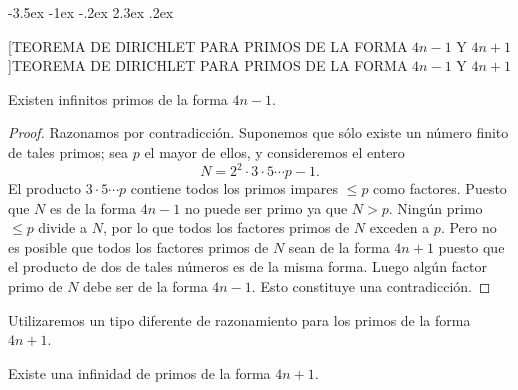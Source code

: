 \documentclass[12pt,a4paper]{book}
\makeatletter
\renewcommand\section{\@startsection{section}{1}{\z@}%
  {-3.5ex \@plus -1ex \@minus -.2ex}%
  {2.3ex \@plus .2ex}%
  {\normalfont\Large\bfseries\raggedright}}
\makeatother
\begin{document}
    \section[TEOREMA DE DIRICHLET PARA PRIMOS DE LA FORMA \texorpdfstring{$4n-1$}{4n-1} Y \texorpdfstring{$4n+1$}{4n+1}]{TEOREMA DE DIRICHLET PARA PRIMOS DE LA FORMA \texorpdfstring{$4n-1$}{4n-1} Y \texorpdfstring{$4n+1$}{4n+1}}

    \begin{teorema}
        Existen infinitos primos de la forma $4n-1$.
    \end{teorema}

    \begin{proof}
        Razonamos por contradicción. Suponemos que sólo existe un número finito de tales
        primos; sea $p$ el mayor de ellos, y consideremos el entero
        \begin{equation*}
            N=2^{2}\cdot3\cdot5\cdots p-1.
        \end{equation*}
        El producto $3\cdot5\cdots p$ contiene todos los primos impares $\leq p$ como
        factores. Puesto que $N$ es de la forma $4n-1$ no puede ser primo ya que $N>p$.
        Ningún primo $\leq p$ divide a $N$, por lo que todos los factores primos de $N$
        exceden a $p$. Pero no es posible que todos los factores primos de $N$ sean de la
        forma $4n+1$ puesto que el producto de dos de tales números es de la misma forma.
        Luego algún factor primo de $N$ debe ser de la forma $4n-1$. Esto constituye una
        contradicción.
    \end{proof}

    Utilizaremos un tipo diferente de razonamiento para los primos de la forma $4n+1$.

    \begin{teorema}
        Existe una infinidad de primos de la forma $4n+1$.
    \end{teorema}
\end{document}
